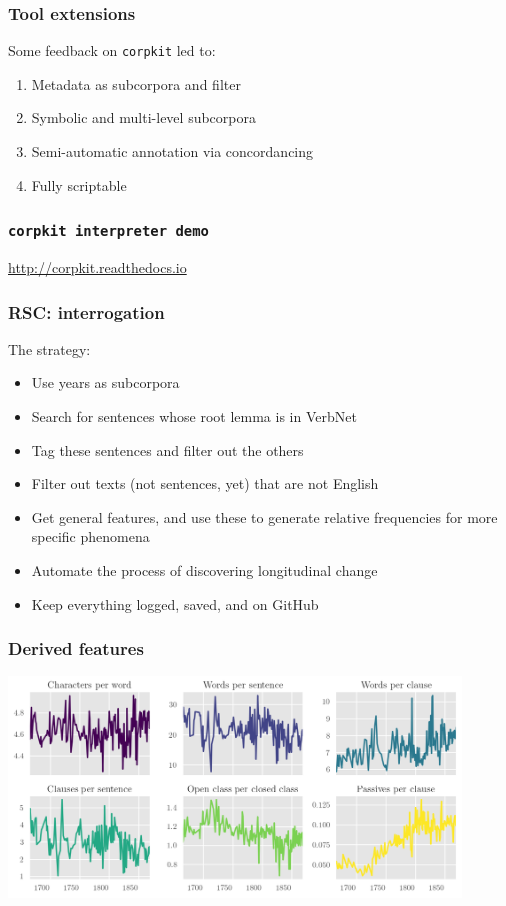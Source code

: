 \documentclass{beamer}       %
\begin{document}
\begin{frame}
\frametitle{Tool extensions}

Some feedback on \texttt{corpkit} led to:

\begin{enumerate}
    \item Metadata as subcorpora and filter
    \item Symbolic and multi-level subcorpora
    \item Semi-automatic annotation via concordancing
    \item Fully scriptable
\end{enumerate}
\end{frame}

\begin{frame}
\frametitle{\texttt{corpkit interpreter demo}}

\url{http://corpkit.readthedocs.io}

\end{frame}

\begin{frame}
\frametitle{RSC: interrogation}

The strategy:

\begin{itemize}
    \item Use years as subcorpora
    \item Search for sentences whose root lemma is in VerbNet
    \item Tag these sentences and filter out the others
    \item Filter out texts (not sentences, yet) that are not English
    \item Get general features, and use these to generate relative frequencies for more specific phenomena
    \item Automate the process of discovering longitudinal change
    \item Keep everything logged, saved, and on GitHub
\end{itemize}
\end{frame}

\begin{frame}
    \frametitle{Derived features}
    \centering
    \includegraphics[width=0.90\textwidth]{../images/best-derived}
\end{frame}
\end{document}
